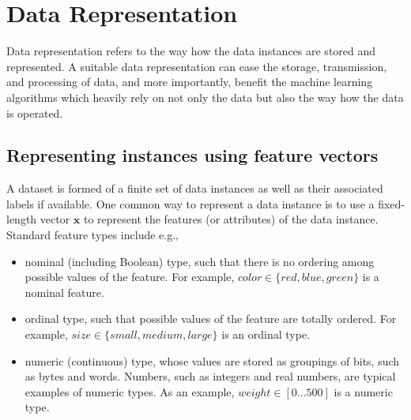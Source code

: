 \section{Data Representation}

Data representation refers to the way how the data instances are stored and represented. A suitable data representation can ease the storage, transmission, and processing of data, and more importantly, benefit the machine learning algorithms which heavily rely on not only the data but also the way how the data is operated.  

\subsection*{Representing instances using feature vectors}\label{sec:datarep}

A dataset is formed of a finite set of data instances as well as their associated labels if available. One common way to represent a data instance is to use a fixed-length vector $\textbf{x}$ to represent the features (or attributes) of the data instance. 
%
Standard feature types include e.g., 
\begin{itemize}
    \item nominal (including Boolean) type, such that there is no ordering among possible values of the feature. For example, $color \in \{red, blue, green\} $ is a nominal feature. 
    \item ordinal type, such that possible values of the feature are totally ordered. For example, $size \in \{small, medium, large\} $ is an ordinal type. 
    \item numeric (continuous) type, whose values are stored as groupings of bits, such as bytes and words. Numbers, such as integers and real numbers, are typical examples of numeric types. As an example, $weight \in [0...500]$ is a numeric type. 

\end{itemize}

